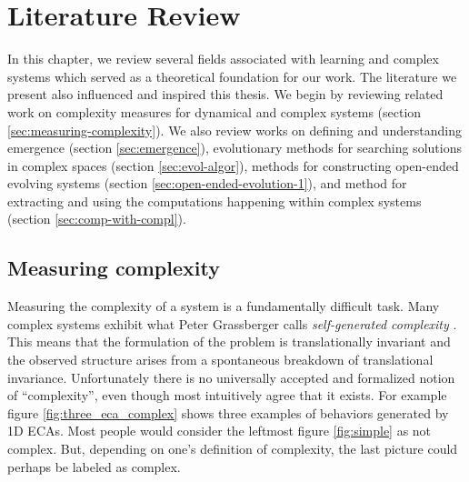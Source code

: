 \chapter{Literature Review}
\label{cha:literature-review}

In this chapter, we review several fields associated with learning and complex
systems which served as a theoretical foundation for our work. The literature we
present also influenced and inspired this thesis. We begin by reviewing related
work on complexity measures for dynamical and complex systems (section
\ref{sec:measuring-complexity}). We also review works on defining and
understanding emergence (section \ref{sec:emergence}), evolutionary methods for
searching solutions in complex spaces (section \ref{sec:evol-algor}), methods
for constructing open-ended evolving systems (section
\ref{sec:open-ended-evolution-1}), and method for extracting and using the
computations happening within complex systems (section
\ref{sec:comp-with-compl}).

\section{Measuring complexity\label{sec:measuring-complexity}}

Measuring the complexity of a system is a fundamentally difficult task. Many
complex systems exhibit what Peter Grassberger calls \emph{self-generated
  complexity} \parencite{grassbergerQuantitativeTheorySelfgenerated1986}. This
means that the formulation of the problem is translationally invariant and the
observed structure arises from a spontaneous breakdown of translational
invariance. Unfortunately there is no universally accepted and formalized notion
of ``complexity'', even though most intuitively agree that it exists. For
example figure \ref{fig:three_eca_complex} shows three examples of behaviors
generated by 1D \acp{ECA}. Most people would consider the leftmost figure
\ref{fig:simple} as not complex. But, depending on one's definition of
complexity, the last picture could perhaps be labeled as complex.

